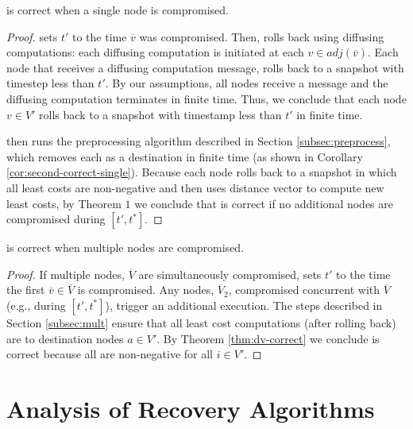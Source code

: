 \begin{corollary}
\label{cor:cpr-correct-single}
\cpr is correct when a single node is compromised.
\end{corollary}
\begin{proof}
\cpr sets $t'$ to the time $\overline{v}$ was compromised. Then, \cpr rolls back using diffusing computations: each diffusing computation is initiated at each $v \in adj(\overline{v})$.
Each node that receives a diffusing computation message, rolls back to a snapshot with timestep less than $t'$.
By our assumptions, all nodes receive a message and the diffusing computation terminates in finite time.  Thus, we conclude
that each node $v \in V'$ rolls back to a snapshot with timestamp less than $t'$ in finite time.

\cpr then runs the preprocessing algorithm described in Section \ref{subsec:preprocess}, which removes each \bad as a destination in finite time (as shown
in Corollary \ref{cor:second-correct-single}). Because each node rolls back to a snapshot in which all least costs are non-negative and 
\cpr then uses distance vector to compute new least costs, by Theorem $1$ we conclude that \cpr is correct if no additional nodes are compromised during  $[t',t^*]$.
\end{proof}

\begin{corollary}
\label{cor:cpr-correct-mult}
\cpr is correct when multiple nodes are compromised.
\end{corollary}
\begin{proof}
If multiple nodes, $\overline{V}$ are simultaneously compromised, \cpr sets $t'$ to the time the first $\overline{v} \in \overline{V}$ is compromised.  Any nodes, $\overline{V}_2$, compromised
concurrent with $\overline{V}$ (e.g., during  $[t',t^*]$), trigger an additional \cpr execution.  The steps described in Section \ref{subsec:mult} ensure 
that all least cost computations (after rolling back) are to
destination nodes $a \in V'$.  By Theorem \ref{thm:dv-correct} we conclude \cpr is correct because all \dmatrixi are non-negative for all $i \in V'$.
\end{proof}





\section{Analysis of Recovery Algorithms}
\label{sec:analysis}

